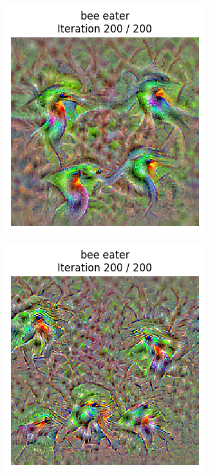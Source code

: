 \begin{figure}[H]
    \centering
    \begin{subfigure}[t]{.33\textwidth}
        \centering
        \includegraphics[width=\linewidth]{SqueezeNet/bird_animated_reg++_last_frame.png}
        \caption{}
        \label{fig:class_viz_reg:sub1}
    \end{subfigure}%
    \begin{subfigure}[t]{.33\textwidth}
        \centering
        \includegraphics[width=\linewidth]{SqueezeNet/bird_animated_last_frame.png}

\end{subfigure}
\end{figure}
